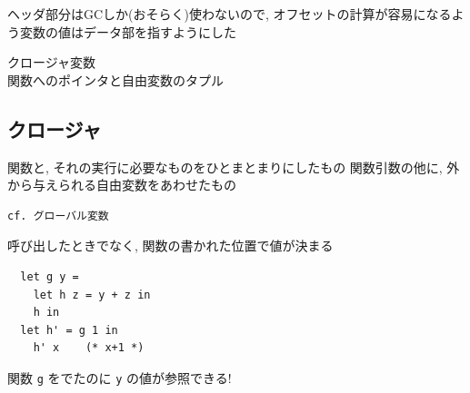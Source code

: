 \documentclass[papersize,30pt,slide]{jsarticle}
\begin{document}
\vspace{1em}

ヘッダ部分はGCしか(おそらく)使わないので, オフセットの計算が容易になるよう変数の値はデータ部を指すようにした

\vspace{1em}

クロージャ変数 \\
関数へのポインタと自由変数のタプル

\newpage
\subsection{クロージャ}
関数と, それの実行に必要なものをひとまとまりにしたもの
関数引数の他に, 外から与えられる自由変数をあわせたもの

\begin{verbatim}
cf. グローバル変数
\end{verbatim}
呼び出したときでなく, 関数の書かれた位置で値が決まる

\begin{lstlisting}
  let g y =
    let h z = y + z in
    h in
  let h' = g 1 in
    h' x    (* x+1 *)
\end{lstlisting}
関数 \lstinline|g| をでたのに \lstinline|y| の値が参照できる!
\end{document}
